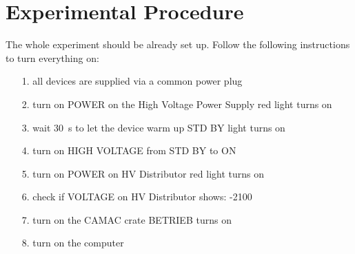 \section{Experimental Procedure}

The whole experiment should be already set up. Follow the following instructions to turn everything on:
\begin{itemize}
 \item[1.] all devices are supplied via a common power plug
 \item[2.] turn on  POWER on the High Voltage Power Supply \ra red light turns on
 \item[3.] wait \SI{30}{\second} to let the device warm up \ra STD BY light turns on
 \item[4.] turn on HIGH VOLTAGE from STD BY to ON
 \item[5.] turn on POWER on HV Distributor \ra red light turns on
 \item[6.] check if VOLTAGE on HV Distributor shows: -2100
 \item[7.] turn on the CAMAC crate \ra BETRIEB turns on
 \item[8.] turn on the computer
\end{itemize}







